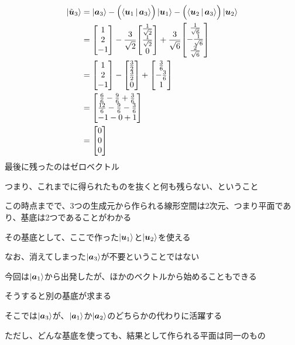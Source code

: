 \documentclass[../book_half_step_linear]{subfiles}
\begin{document}
\begin{align*}
  \ket{\tilde{\vb*{u}}_3} & = \ket{\vb*{a}_3} - \Bigl(\Braket{\vb*{u}_1|\vb*{a}_3}\Bigr) \ket{\vb*{u}_1} - \Bigl(\Braket{\vb*{u}_2|\vb*{a}_3}\Bigr) \ket{\vb*{u}_2} \\
                          & = \mqty[1                                                                                                                               \\ 2 \\ -1] - \frac{3}{\sqrt{2}} \mqty[\frac{1}{\sqrt{2}} \\ \frac{1}{\sqrt{2}} \\ 0] + \frac{3}{\sqrt{6}} \mqty[\frac{1}{\sqrt{6}} \\ -\frac{1}{\sqrt{6}} \\ \frac{2}{\sqrt{6}}] \\
                          & = \mqty[1                                                                                                                               \\ 2 \\ -1] - \mqty[\frac{3}{2} \\ \frac{3}{2} \\ 0] + \mqty[\frac{3}{6} \\ -\frac{3}{6} \\ 1] \\
                          & = \mqty[\frac{6}{6} - \frac{9}{6} + \frac{3}{6}                                                                                         \\ \frac{12}{6} - \frac{9}{6} - \frac{3}{6} \\ -1 - 0 + 1] \\
                          & = \mqty[0                                                                                                                               \\ 0 \\ 0 ]
\end{align*}
最後に残ったのはゼロベクトル

つまり、これまでに得られたものを抜くと何も残らない、ということ

\br

この時点までで、3つの生成元から作られる線形空間は2次元、つまり平面であり、基底は2つであることがわかる

その基底として、ここで作った$\ket{\vb*{u}_1}$と$\ket{\vb*{u}_2}$を使える

\br

なお、消えてしまった$\ket{\vb*{a}_3}$が不要ということではない

今回は$\ket{\vb*{a}_1}$から出発したが、ほかのベクトルから始めることもできる

そうすると別の基底が求まる

そこでは$\ket{\vb*{a}_3}$が、$\ket{\vb*{a}_1}$か$\ket{\vb*{a}_2}$のどちらかの代わりに活躍する

ただし、どんな基底を使っても、結果として作られる平面は同一のもの
\end{document}
